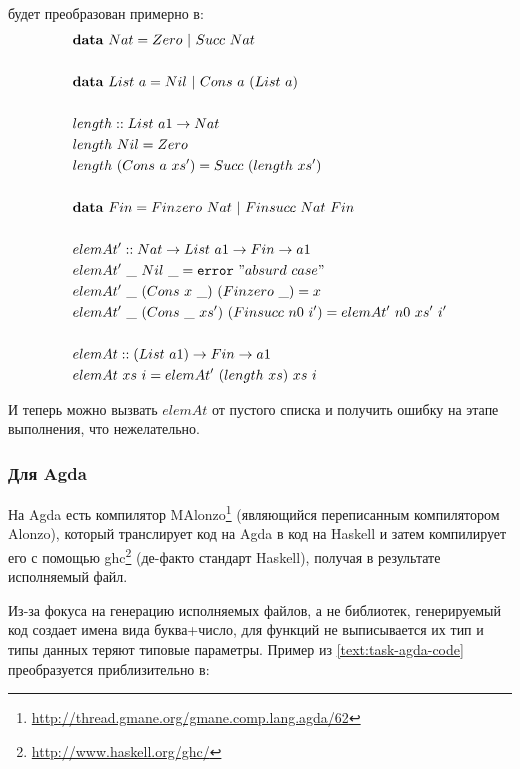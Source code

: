 будет преобразован примерно в:
\begin{align*}
&\mathbf{data}\ Nat = Zero\ |\ Succ\ Nat\\
\\
&\mathbf{data}\ List\ a = Nil\ |\ Cons\ a\ (List\ a)\\
\\
&length :: List\ a1 \rightarrow Nat\\
&length\ Nil = Zero\\
&length\ (Cons\ a\ xs') = Succ\ (length\ xs')\\
\\
&\mathbf{data}\ Fin = Finzero\ Nat\ |\ Finsucc\ Nat\ Fin\\
\\
&elemAt' :: Nat \rightarrow List\ a1 \rightarrow Fin \rightarrow a1\\
&elemAt'\ \_\ Nil\ \_ = \texttt{error}\ "absurd\ case"\\
&elemAt'\ \_\ (Cons\ x\ \_)\ (Finzero\ \_) = x\\
&elemAt'\ \_\ (Cons\ \_\ xs')\ (Finsucc\ n0\ i') = elemAt'\ n0\ xs'\ i'\\
\\
&elemAt :: (List\ a1) \rightarrow Fin \rightarrow a1\\
&elemAt\ xs\ i = elemAt'\ (length\ xs)\ xs\ i
\end{align*}

И теперь можно вызвать \(elemAt\) от пустого списка и получить ошибку на
этапе выполнения, что нежелательно.

\subsubsection{Для Agda}

На Agda есть компилятор
MAlonzo\footnote{\url{http://thread.gmane.org/gmane.comp.lang.agda/62}}
(являющийся переписанным компилятором Alonzo\cite{Ben07}), который транслирует
код на Agda в код на Haskell и затем компилирует его с помощью
ghc\footnote{\url{http://www.haskell.org/ghc/}} (де-факто стандарт Haskell),
получая в результате исполняемый файл.

Из-за фокуса на генерацию исполняемых файлов, а не библиотек,
генерируемый код создает имена вида буква+число, для функций
не выписывается их тип и типы данных теряют типовые параметры.
Пример из \ref{text:task-agda-code} преобразуется приблизительно в:

